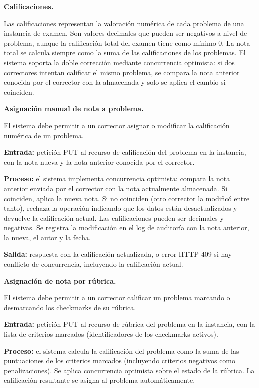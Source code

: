 \begin{functional}
  \item \textbf{Calificaciones.}

  Las calificaciones representan la valoración numérica de cada problema de una instancia de examen. Son valores decimales que pueden ser negativos a nivel de problema, aunque la calificación total del examen tiene como mínimo 0. La nota total se calcula siempre como la suma de las calificaciones de los problemas. El sistema soporta la doble corrección mediante concurrencia optimista: si dos correctores intentan calificar el mismo problema, se compara la nota anterior conocida por el corrector con la almacenada y solo se aplica el cambio si coinciden.

  \begin{functional}
    \item \textbf{Asignación manual de nota a problema.}

    El sistema debe permitir a un corrector asignar o modificar la calificación numérica de un problema.

    \textbf{Entrada:} petición PUT al recurso de calificación del problema en la instancia, con la nota nueva y la nota anterior conocida por el corrector.

    \textbf{Proceso:} el sistema implementa concurrencia optimista: compara la nota anterior enviada por el corrector con la nota actualmente almacenada. Si coinciden, aplica la nueva nota. Si no coinciden (otro corrector la modificó entre tanto), rechaza la operación indicando que los datos están desactualizados y devuelve la calificación actual. Las calificaciones pueden ser decimales y negativas. Se registra la modificación en el log de auditoría con la nota anterior, la nueva, el autor y la fecha.

    \textbf{Salida:} respuesta con la calificación actualizada, o error HTTP 409 si hay conflicto de concurrencia, incluyendo la calificación actual.

    \item \textbf{Asignación de nota por rúbrica.}

    El sistema debe permitir a un corrector calificar un problema marcando o desmarcando los checkmarks de su rúbrica.

    \textbf{Entrada:} petición PUT al recurso de rúbrica del problema en la instancia, con la lista de criterios marcados (identificadores de los checkmarks activos).

    \textbf{Proceso:} el sistema calcula la calificación del problema como la suma de las puntuaciones de los criterios marcados (incluyendo criterios negativos como penalizaciones). Se aplica concurrencia optimista sobre el estado de la rúbrica. La calificación resultante se asigna al problema automáticamente.


\end{functional}
\end{functional}
